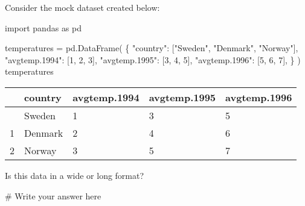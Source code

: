 \documentclass[
  letterpaper,
  DIV=11,
  numbers=noendperiod]{scrreprt}
\newenvironment{Shaded}{\begin{snugshade}}{\end{snugshade}}
\newcommand{\CommentTok}[1]{\textcolor[rgb]{0.37,0.37,0.37}{#1}}
\newcommand{\DecValTok}[1]{\textcolor[rgb]{0.68,0.00,0.00}{#1}}
\newcommand{\ImportTok}[1]{\textcolor[rgb]{0.00,0.46,0.62}{#1}}
\newcommand{\NormalTok}[1]{\textcolor[rgb]{0.00,0.23,0.31}{#1}}
\newcommand{\OperatorTok}[1]{\textcolor[rgb]{0.37,0.37,0.37}{#1}}
\newcommand{\StringTok}[1]{\textcolor[rgb]{0.13,0.47,0.30}{#1}}
\begin{document}
\begin{tcolorbox}[enhanced jigsaw, colframe=quarto-callout-tip-color-frame, opacityback=0, titlerule=0mm, bottomrule=.15mm, breakable, leftrule=.75mm, colbacktitle=quarto-callout-tip-color!10!white, title=\textcolor{quarto-callout-tip-color}{\faLightbulb}\hspace{0.5em}{Practice}, rightrule=.15mm, coltitle=black, opacitybacktitle=0.6, colback=white, left=2mm, arc=.35mm, toptitle=1mm, bottomtitle=1mm, toprule=.15mm]

Consider the mock dataset created below:

\begin{Shaded}
\begin{Highlighting}[]
\ImportTok{import}\NormalTok{ pandas }\ImportTok{as}\NormalTok{ pd}

\NormalTok{temperatures }\OperatorTok{=}\NormalTok{ pd.DataFrame(}
\NormalTok{    \{}
        \StringTok{"country"}\NormalTok{: [}\StringTok{"Sweden"}\NormalTok{, }\StringTok{"Denmark"}\NormalTok{, }\StringTok{"Norway"}\NormalTok{],}
        \StringTok{"avgtemp.1994"}\NormalTok{: [}\DecValTok{1}\NormalTok{, }\DecValTok{2}\NormalTok{, }\DecValTok{3}\NormalTok{],}
        \StringTok{"avgtemp.1995"}\NormalTok{: [}\DecValTok{3}\NormalTok{, }\DecValTok{4}\NormalTok{, }\DecValTok{5}\NormalTok{],}
        \StringTok{"avgtemp.1996"}\NormalTok{: [}\DecValTok{5}\NormalTok{, }\DecValTok{6}\NormalTok{, }\DecValTok{7}\NormalTok{],}
\NormalTok{    \}}
\NormalTok{)}
\NormalTok{temperatures}
\end{Highlighting}
\end{Shaded}

\begin{longtable}[]{@{}lllll@{}}
\toprule\noalign{}
& country & avgtemp.1994 & avgtemp.1995 & avgtemp.1996 \\
\midrule\noalign{}
\endhead
\bottomrule\noalign{}
\endlastfoot
0 & Sweden & 1 & 3 & 5 \\
1 & Denmark & 2 & 4 & 6 \\
2 & Norway & 3 & 5 & 7 \\
\end{longtable}

Is this data in a wide or long format?

\begin{Shaded}
\begin{Highlighting}[]
\CommentTok{\# Write your answer here}
\end{Highlighting}
\end{Shaded}

\end{tcolorbox}
\end{document}
